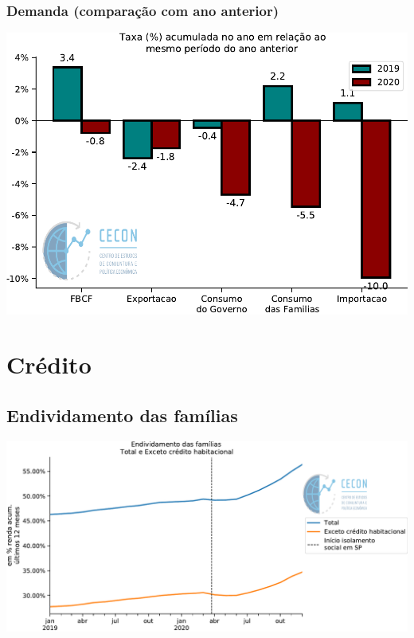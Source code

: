 \documentclass{SelfArx}
\begin{document}
\subsubsection*{Demanda (comparação com ano anterior)}
\label{sec:org4c7e7e2}

\begin{center}
\includegraphics[width=.9\linewidth]{./figs/PIB/Demanda_Acum_Comparativo.pdf}
\end{center}

\section*{Crédito}
\label{sec:org1742389}

\subsection*{Endividamento das famílias}
\label{sec:org02a6b80}

\begin{center}
\includegraphics[width=.9\linewidth]{./figs/Credito/EndividamentoFamilias.pdf}
\end{center}
\end{document}
